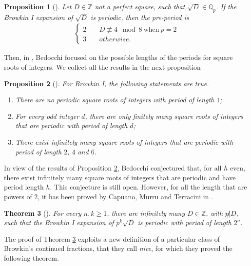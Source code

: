 \documentclass[12pt, reqno]{amsart}
\theoremstyle{plain}
\newtheorem{Theorem}{Theorem}
\newtheorem{Proposition}[Theorem]{Proposition}
\theoremstyle{definition}
\begin{document}
\begin{Proposition}[\cite{BEI}]
Let $D\in\mathbb{Z}$ not a perfect square, such that $\sqrt{D}\in\mathbb{Q}_p$. If the \textit{Browkin I} expansion of $\sqrt{D}$ is periodic, then the pre-period is
\begin{align*} 
\begin{cases}
2 \ \ \ \ \ & D \not\equiv 4 \mod 8 \ \text{when} \ p=2 \\
3 \ \ \ \ \ & otherwise.
\end{cases}
\end{align*}
\end{Proposition}

Then, in \cite{BEII, BEIII, BEIV}, Bedocchi focused on the possible lengths of the periods for square roots of integers. We collect all the results in the next proposition 

\begin{Proposition}[\cite{BEII, BEIII, BEIV}]\label{Prop: PropBedocchi}
For \textit{Browkin I}, the following statements are true.
\begin{enumerate}
    \item[i)] There are no periodic square roots of integers with period of length $1$;
    \item[ii)] For every odd integer $d$, there are only finitely many square roots of integers that are periodic with period of length $d$;
    \item[iii)] There exist infinitely many square roots of integers that are periodic with period of length $2$, $4$ and $6$.
\end{enumerate}   
\end{Proposition}

In view of the results of Proposition \ref{Prop: PropBedocchi}, Bedocchi conjectured that, for all $h$ even, there exist infinitely many square roots of integers that are periodic and have period length $h$. This conjecture is still open. However, for all the length that are powers of $2$, it has been proved by Capuano, Murru and Terracini in \cite{CMT}.

\begin{Theorem}[\cite{CMT}]\label{Thm: CMT}
For every $n,k\geq 1$, there are infinitely many $D\in\mathbb{Z}$, with $p\not | D$, such that the \textit{Browkin I} expansion of $p^k\sqrt{D}$ is periodic with period of length $2^n$. 
\end{Theorem}

The proof of Theorem \ref{Thm: CMT} exploits a new definition of a particular class of Browkin's continued fractions, that they call \textit{nice}, for which they proved the following theorem.
\end{document}
